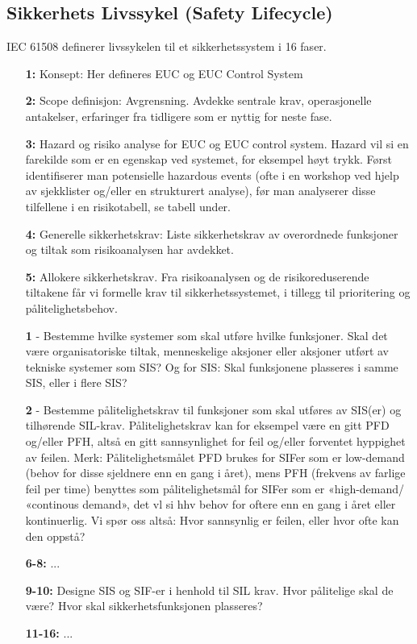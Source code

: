 \subsection{Sikkerhets Livssykel (Safety Lifecycle)}

IEC 61508 definerer livssykelen til et sikkerhetssystem i 16 faser.

\begin{itemize}
    \item[\textbf{1:}] Konsept:  Her defineres EUC og EUC Control System
    \item[\textbf{2:}] Scope definisjon: Avgrensning. Avdekke sentrale krav, operasjonelle antakelser, erfaringer fra tidligere som er nyttig for neste fase.
    \item[\textbf{3:}] Hazard og risiko analyse for EUC og EUC control system. Hazard vil si en farekilde som er en egenskap ved systemet, for eksempel høyt trykk. Først identifiserer man potensielle hazardous events (ofte i en workshop ved hjelp av sjekklister og/eller en strukturert analyse), før man analyserer disse tilfellene i en risikotabell, se tabell under.
    \item[\textbf{4:}] Generelle sikkerhetskrav: Liste sikkerhetskrav av overordnede funksjoner og tiltak som risikoanalysen har avdekket.
    \item[\textbf{5:}] Allokere sikkerhetskrav. Fra risikoanalysen og de risikoreduserende tiltakene får vi formelle krav til sikkerhetssystemet, i tillegg til prioritering og pålitelighetsbehov. 
    
    \textbf{1} - Bestemme hvilke systemer som skal utføre hvilke funksjoner. Skal det være organisatoriske tiltak, menneskelige aksjoner eller aksjoner utført av tekniske systemer som SIS? Og for SIS: Skal funksjonene plasseres i samme SIS, eller i flere SIS?
    
    \textbf{2} - Bestemme pålitelighetskrav til funksjoner som skal utføres av SIS(er) og tilhørende SIL-krav. Pålitelighetskrav kan for eksempel være en gitt PFD og/eller PFH, altså en gitt sannsynlighet for feil og/eller forventet hyppighet av feilen. Merk: Pålitelighetsmålet PFD brukes for SIFer som er low-demand (behov for disse sjeldnere enn en gang i året), mens PFH (frekvens av farlige feil per time) benyttes som pålitelighetsmål for SIFer som er «high-demand/ «continous demand», det vl si hhv behov for oftere enn en gang i året eller kontinuerlig. Vi spør oss altså: Hvor sannsynlig er feilen, eller hvor ofte kan den oppstå?
    
    \item[\textbf{6-8:}] ...
    \item[\textbf{9-10:}] Designe SIS og SIF-er i henhold til SIL krav. Hvor pålitelige skal de være? Hvor skal sikkerhetsfunksjonen plasseres?
    \item[\textbf{11-16:}] ...

\end{itemize}


